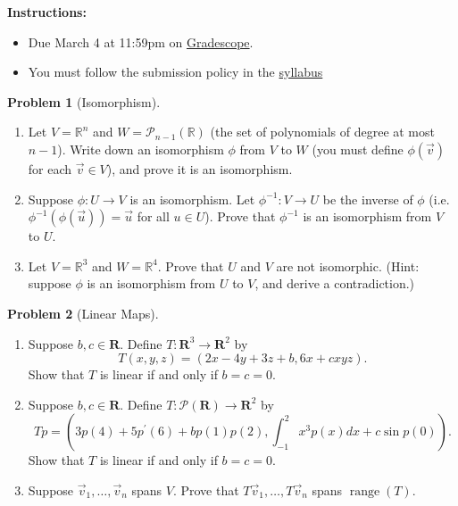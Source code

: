 \documentclass[12pt]{article}
\theoremstyle{definition}
\newtheorem{problem}{Problem}
\newcommand{\range}{\operatorname{range}}
\begin{document}
\textbf{\Large{}}
    
\vspace{-1.8em}
\hrulefill

\textbf{Instructions:}
    \begin{itemize}
        \item Due March 4 at 11:59pm on \href{https://www.gradescope.com/courses/709136}{Gradescope}.
        \item You must follow the submission policy in the \href{https://courses.chen.pw/la_s2024/syllabus.html}{syllabus} 
\end{itemize}
   
\vspace{.5em}

\begin{problem}[Isomorphism]~
    \begin{enumerate}
        \item Let $V = \mathbb{R}^n$ and $W = \mathcal{P}_{n-1}(\mathbb{R})$ (the set of polynomials of degree at most $n-1$). Write down an isomorphism $\phi$ from $V$ to $W$ (you must define $\phi(\vec{v})$ for each $\vec{v}\in V$), and prove it is an isomorphism.
        \item Suppose $\phi:U\to V$ is an isomorphism. Let $\phi^{-1}:V\to U$ be the inverse of $\phi$ (i.e. $\phi^{-1}(\phi(\vec{u})) = \vec{u}$ for all $u\in U$). Prove that $\phi^{-1}$ is an isomorphism from $V$ to $U$.
        \item Let $V = \mathbb{R}^3$ and $W = \mathbb{R}^4$. Prove that $U$ and $V$ are not isomorphic. (Hint: suppose $\phi$ is an isomorphism from $U$ to $V$, and derive a contradiction.)
    \end{enumerate}
    \end{problem}


\begin{problem}[Linear Maps]~
\begin{enumerate}
    \item Suppose $b, c \in \mathbf{R}$. Define $T: \mathbf{R}^3 \rightarrow \mathbf{R}^2$ by
    \[
    T(x, y, z)=(2 x-4 y+3 z+b, 6 x+c x y z) .
    \]
    Show that $T$ is linear if and only if $b=c=0$.

    \item Suppose $b, c \in \mathbf{R}$. Define $T: \mathcal{P}(\mathbf{R}) \rightarrow \mathbf{R}^2$ by
    \[
    T p=\left(3 p(4)+5 p^{\prime}(6)+b p(1) p(2), \int_{-1}^2 x^3 p(x) d x+c \sin p(0)\right) .
    \]
    Show that $T$ is linear if and only if $b=c=0$.
    \item Suppose $\vec{v}_1, \ldots, \vec{v}_n$ spans $V$. Prove that $T \vec{v}_1, \ldots, T \vec{v}_n$ spans $\range(T)$.
\end{enumerate}
\end{problem}
\end{document}
